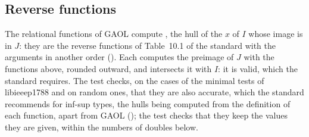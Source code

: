 \subsection{Reverse functions}\label{sec:accuracy-reverse}
%

The relational functions of GAOL compute , the hull of
the $x$ of $I$ whose image is in $J$: they are the reverse functions of
Table~10.1 of the standard with the arguments in another order
(). Each computes the preimage of $J$
with the functions above, rounded outward, and intersects it with $I$: it
is valid, which the standard requires. The test 
checks, on the cases of the minimal tests of libieeep1788 and on random
ones, that they are also accurate, which the standard recommends for
inf-sup types, the hulls being computed from the definition of each
function, apart from GAOL (); the test
 checks that they keep the values they
are given, within the numbers of doubles below.

